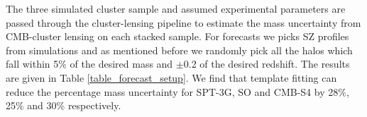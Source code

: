 

The three simulated cluster sample and assumed experimental parameters are passed through the cluster-lensing pipeline to estimate the mass uncertainty from CMB-cluster lensing on each stacked sample. 
 For forecasts we picks SZ profiles from \cite{takahashi17} simulations and as mentioned before we randomly pick all the halos which fall within 5\% of the desired mass and $\pm$0.2 of the desired redshift.
The results are given in Table \ref{table_forecast_setup}. 
We find that template fitting can reduce the percentage mass uncertainty for SPT-3G, SO and CMB-S4 by 28\%, 25\% and 30\% respectively.%

